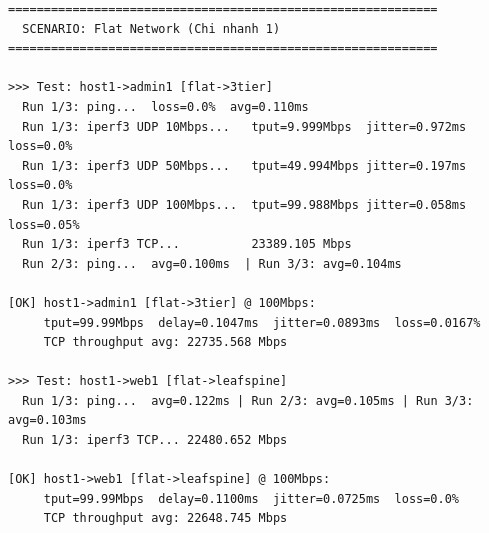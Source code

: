 \begin{lstlisting}[style=termstyle, caption={Log đo lường cross-branch -- từ Flat sang các chi nhánh khác}]
============================================================
  SCENARIO: Flat Network (Chi nhanh 1)
============================================================

>>> Test: host1->admin1 [flat->3tier]
  Run 1/3: ping...  loss=0.0%  avg=0.110ms
  Run 1/3: iperf3 UDP 10Mbps...   tput=9.999Mbps  jitter=0.972ms  loss=0.0%
  Run 1/3: iperf3 UDP 50Mbps...   tput=49.994Mbps jitter=0.197ms  loss=0.0%
  Run 1/3: iperf3 UDP 100Mbps...  tput=99.988Mbps jitter=0.058ms  loss=0.05%
  Run 1/3: iperf3 TCP...          23389.105 Mbps
  Run 2/3: ping...  avg=0.100ms  | Run 3/3: avg=0.104ms

[OK] host1->admin1 [flat->3tier] @ 100Mbps:
     tput=99.99Mbps  delay=0.1047ms  jitter=0.0893ms  loss=0.0167%
     TCP throughput avg: 22735.568 Mbps

>>> Test: host1->web1 [flat->leafspine]
  Run 1/3: ping...  avg=0.122ms | Run 2/3: avg=0.105ms | Run 3/3: avg=0.103ms
  Run 1/3: iperf3 TCP... 22480.652 Mbps

[OK] host1->web1 [flat->leafspine] @ 100Mbps:
     tput=99.99Mbps  delay=0.1100ms  jitter=0.0725ms  loss=0.0%
     TCP throughput avg: 22648.745 Mbps
\end{lstlisting}

